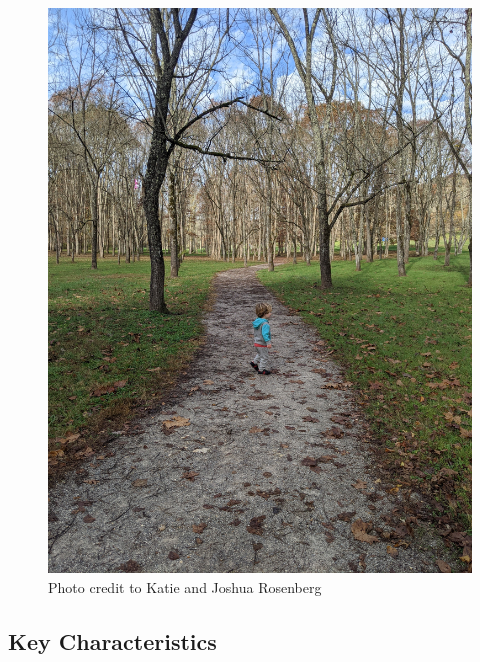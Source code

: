 \documentclass[
  letterpaper,
  DIV=11,
  numbers=noendperiod]{scrreprt}
\begin{document}
\begin{figure}[H]

{\centering \includegraphics[width=6.25in,height=\textheight,keepaspectratio]{img/trail-11-figure-01.jpg}

}

\caption{Photo credit to Katie and Joshua Rosenberg}

\end{figure}%

\subsection{Key Characteristics}\label{key-characteristics-10}
\end{document}
